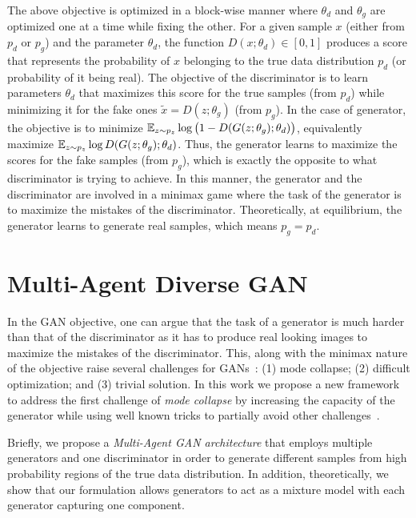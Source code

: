 The above objective is optimized in a block-wise manner where $\theta_d$ and $\theta_g$ are optimized one at a time while fixing the other. For a given sample $x$ (either from $p_d$ or $p_g$) and the parameter $\theta_d$, the function $D(x; \theta_d) \in [0, 1]$ produces a score that represents the probability of $x$ belonging to the true data distribution $p_d$ (or probability of it being real). The objective of the discriminator is to learn parameters $\theta_d$ that maximizes this score for the true samples (from $p_d$) while minimizing it for the fake ones $\tilde{x} = D(z; \theta_g)$ (from $p_g$). In the case of generator, the objective is to minimize $\operatorname{\mathbb{E}}_{z \sim p_z}\log \big( 1 - D(G(z; \theta_g) ; \theta_d) \big)$, equivalently maximize $\operatorname{\mathbb{E}}_{z \sim p_z} \log D(G(z; \theta_g) ; \theta_d)$. Thus, the generator learns to maximize the scores for the fake samples (from $p_g$), which is exactly the opposite to what discriminator is trying to achieve. In this manner, the generator and the discriminator are involved in a minimax game where the task of the generator is to maximize the mistakes of the discriminator. Theoretically, at equilibrium, the generator learns to generate real samples, which means $p_g = p_d$.

\section{Multi-Agent Diverse GAN}
In the GAN objective, one can argue that the task of a generator is much harder than that of the discriminator as it has to produce real looking images to maximize the mistakes of the discriminator. This, along with the minimax nature of the objective raise several challenges for GANs~\cite{arjovsky2016towards,che2016mode,chen2016infogan,metz2017unrolledGAN,salimans2016improved}: (1) mode collapse; (2) difficult optimization; and (3) trivial solution. In this work we propose a new framework to address the first challenge of {\em mode collapse} by increasing the capacity of the generator while using well known tricks to partially avoid other challenges~\cite{arjovsky2016towards}. 

Briefly, we propose a {\em Multi-Agent GAN architecture} that employs multiple generators and one discriminator in order to generate different samples from high probability regions of the true data distribution. 
In addition, theoretically, we show that our formulation allows generators to act as a mixture model with each generator capturing one component. 


